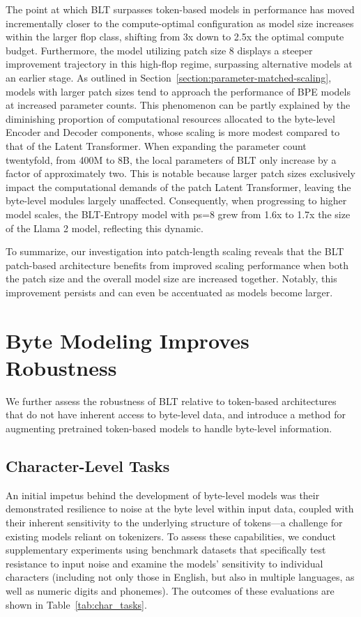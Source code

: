 The point at which {\textsc BLT} surpasses token-based models in performance has moved incrementally closer to the compute-optimal configuration as model size increases within the larger flop class, shifting from 3x down to 2.5x the optimal compute budget. Furthermore, the model utilizing patch size 8 displays a steeper improvement trajectory in this high-flop regime, surpassing alternative models at an earlier stage. As outlined in Section~\ref{section:parameter-matched-scaling}, models with larger patch sizes tend to approach the performance of BPE models at increased parameter counts. This phenomenon can be partly explained by the diminishing proportion of computational resources allocated to the byte-level Encoder and Decoder components, whose scaling is more modest compared to that of the Latent Transformer. When expanding the parameter count twentyfold, from 400M to 8B, the local parameters of {\textsc BLT} only increase by a factor of approximately two. This is notable because larger patch sizes exclusively impact the computational demands of the patch Latent Transformer, leaving the byte-level modules largely unaffected. Consequently, when progressing to higher model scales, the {\textsc BLT}-Entropy model with ps=8 grew from 1.6x to 1.7x the size of the Llama 2 model, reflecting this dynamic.

To summarize, our investigation into patch-length scaling reveals that the {\textsc BLT} patch-based architecture benefits from improved scaling performance when both the patch size and the overall model size are increased together. Notably, this improvement persists and can even be accentuated as models become larger.

\section{Byte Modeling Improves Robustness} We further assess the robustness of {\textsc BLT} relative to token-based architectures that do not have inherent access to byte-level data, and introduce a method for augmenting pretrained token-based models to handle byte-level information.
\label{sec:robustness}

\subsection{Character-Level Tasks}

An initial impetus behind the development of byte-level models was their demonstrated resilience to noise at the byte level within input data, coupled with their inherent sensitivity to the underlying structure of tokens—a challenge for existing models reliant on tokenizers. To assess these capabilities, we conduct supplementary experiments using benchmark datasets that specifically test resistance to input noise and examine the models' sensitivity to individual characters (including not only those in English, but also in multiple languages, as well as numeric digits and phonemes). The outcomes of these evaluations are shown in Table~\ref{tab:char_tasks}.

